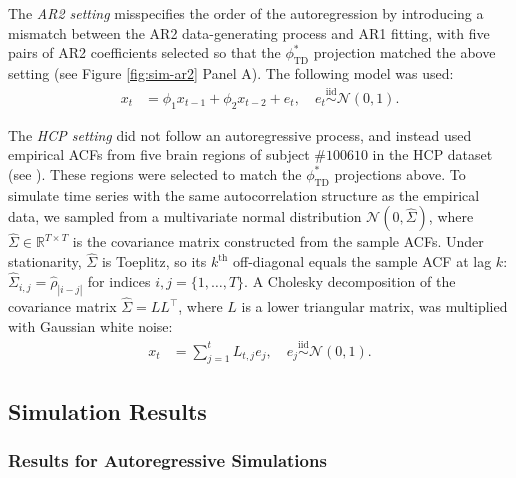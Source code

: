 \documentclass[9pt]{article}
\newcommand{\phitd}{\phi_{\scriptscriptstyle\text{TD}}}
\begin{document}
The \textit{AR2 setting} misspecifies the order of the autoregression by introducing a mismatch between the AR2 data-generating process and AR1 fitting,  with five pairs of AR2 coefficients selected so that the $\phitd^*$ projection matched the above setting (see Figure \ref{fig:sim-ar2} Panel A). The following model was used:
\begin{align}\label{eq:sim-td-ar2}
    x_t &= \phi_1 x_{t-1} + \phi_2 x_{t-2} + e_t, \quad e_t \overset{\text{iid}}{\sim} \mathcal{N}(0, 1).
\end{align}

The \textit{HCP setting} did not follow an autoregressive process, and instead used empirical ACFs from five brain regions of subject $\#100610$ in the HCP dataset (see ). These regions were selected to match the $\phitd^*$ projections above. To simulate time series with the same autocorrelation structure as the empirical data, we sampled from a multivariate normal distribution $\mathcal{N}(0, \hat\Sigma)$, where $\hat\Sigma \in \mathbb{R}^{T\times T}$ is the covariance matrix constructed from the sample ACFs. Under stationarity, $\hat\Sigma$ is Toeplitz, so its $k^\text{th}$ off-diagonal equals the sample ACF at lag $k$: $\hat\Sigma_{i,j} = \hat\rho_{|i-j|}$ for indices $i,j=\{1, \dots, T\}$. A Cholesky decomposition of the covariance matrix $\hat\Sigma = LL^{\top}$, where $L$ is a lower triangular matrix, was multiplied with Gaussian white noise:
\begin{align}\label{eq:sim-td-hcp}
    x_t &= \sum_{j=1}^t L_{t,j} e_j, \quad e_j \overset{\text{iid}}{\sim} \mathcal{N}(0, 1).
\end{align}

\subsection{Simulation Results}

\subsubsection{Results for Autoregressive Simulations}
\end{document}
